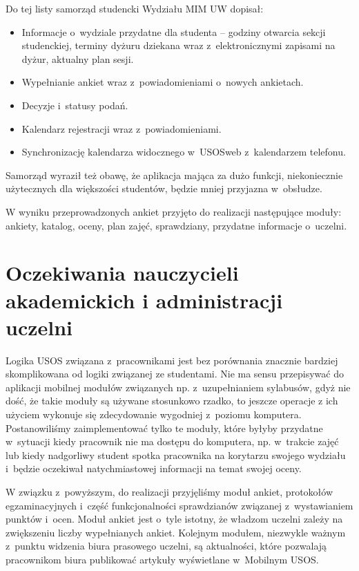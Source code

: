 \documentclass{pracamgr}
\begin{document}
Do tej listy samorząd studencki Wydziału MIM UW dopisał:

\begin{itemize}
	\item Informacje o~wydziale przydatne dla studenta -- godziny otwarcia sekcji
	      studenckiej, terminy dyżuru dziekana wraz z~elektronicznymi zapisami na
	      dyżur, aktualny plan sesji.
	\item Wypełnianie ankiet wraz z~powiadomieniami o~nowych ankietach.
	\item Decyzje i~statusy podań.
	\item Kalendarz rejestracji wraz z~powiadomieniami.
	\item Synchronizację kalendarza widocznego w~USOSweb z~kalendarzem telefonu.
\end{itemize}
Samorząd wyraził też obawę, że aplikacja mająca za dużo funkcji, niekoniecznie
użytecznych dla większości studentów, będzie mniej przyjazna w~obsłudze.

W wyniku przeprowadzonych ankiet przyjęto do realizacji następujące moduły:
ankiety, katalog, oceny, plan zajęć, sprawdziany, przydatne informacje o~uczelni.

\section{Oczekiwania nauczycieli akademickich i administracji uczelni}

Logika USOS związana z~pracownikami jest bez porównania znacznie bardziej
skomplikowana od logiki związanej ze studentami. Nie ma sensu przepisywać do
aplikacji mobilnej modułów związanych np. z~uzupełnianiem sylabusów, gdyż
nie dość, że takie moduły są używane stosunkowo rzadko, to jeszcze operacje
z ich użyciem wykonuje się zdecydowanie wygodniej z~poziomu komputera. Postanowiliśmy
zaimplementować tylko te moduły, które byłyby przydatne w~sytuacji kiedy pracownik
nie ma dostępu do komputera, np. w~trakcie zajęć lub kiedy nadgorliwy student
spotka pracownika na korytarzu swojego wydziału i~będzie oczekiwał natychmiastowej
informacji na temat swojej oceny.

W związku z~powyższym, do realizacji przyjęliśmy moduł ankiet, protokołów
egzaminacyjnych i~część funkcjonalności sprawdzianów związanej z~wystawianiem
punktów i~ocen. Moduł ankiet jest o~tyle istotny, że władzom uczelni zależy na
zwiększeniu liczby wypełnianych ankiet. Kolejnym modułem, niezwykle ważnym z~punktu widzenia biura prasowego uczelni, są aktualności, które pozwalają pracownikom
biura publikować artykuły wyświetlane w~Mobilnym USOS.
\end{document}
